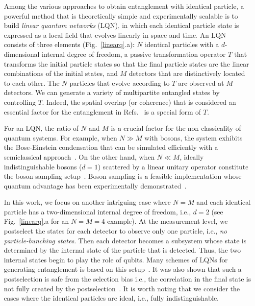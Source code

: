 \documentclass[a4paper,twocolumn,8pt,accepted=2021-12-15]{quantumarticle}
\begin{document}
	
	Among the various approaches to obtain entanglement with identical particle, a powerful method that is theoretically simple and experimentally scalable is to build \emph{linear quantum networks} (LQN), in which each identical particle state is expressed as a local field that evolves linearly in space and time. An LQN consists of three elements (Fig.~\ref{linearq}.a): $N$ identical particles with a $d$-dimensional internal degree of freedom, a passive transformation operator $T$ that transforms the initial particle states so that the final particle states are the linear combinations of the initial states, and $M$ detectors that are distinctively located to each other. The $N$ particles that evolve according to $T$ are observed at $M$ detectors. We can generate a variety of multipartite entangled states by controlling $T$. Indeed, the spatial overlap (or coherence) that is considered an essential factor for the entanglement in Refs.~\cite{franco2018indistinguishability, chin2019entanglement,barros:20} is a special form of $T$.   
	
	For an LQN, the ratio of $N$ and $M$ is a crucial factor for the non-classicality of quantum systems. For example, when $N\gg M$ with bosons, the system exhibits the Bose-Einstein condensation that can be simulated efficiently with a semiclassical approach~\cite{urbina2016multi}.
	On the other hand, when $N \ll M$, ideally indistinguishable bosons ($d=1$) scattered by a linear unitary operator constitute the boson sampling setup~\cite{aaronson2011computational}. Boson sampling is a feasible implementation whose quantum advantage has been experimentally demonstrated~\cite{broome2013photonic,spring2013boson,wang2019boson}.
	
	
	
	In this work, we focus on another intriguing case where $N=M$ and each identical particle has a two-dimensional internal degree of freedom, i.e., $d=2$ (see Fig.~\ref{linearq}.a for an $N=M=4$ example). At the measurement level, we postselect the states for each detector to observe only one particle, i.e., \emph{no particle-bunching states}. Then each detector becomes a subsystem whose state is determined by the internal state of the particle that is detected.
		Thus, the two internal states begin to play the role of qubits. Many schemes of LQNs for generating entanglement is based on this setup~\cite{krenn2017entanglement,bellomo2017n,franco2018indistinguishability,kim2020efficient,blasiak2019entangling}. It was also shown  that such a postselection is safe from the selection bias i.e., the correlation in the final state is not fully created by the postselection~\cite{blasiak2020safe}. It is worth noting that we consider the cases where the identical particles are ideal, i.e., fully indistinguishable. 
	
\end{document}
